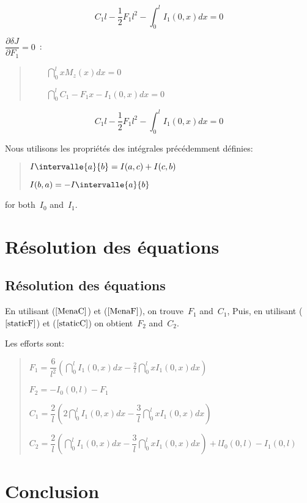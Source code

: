 \begin{equation}
  \label{MenaC}
  C_1l-\frac 12F_1l^2-\int_0^lI_1(0,x)dx=0
\end{equation}

$\dfrac{\partial \delta J}{\partial F_1}=0$~:

\begin{quotation}
$\qquad \dint_0^lxM_z(x)dx=0$

$\qquad \dint_0^lC_1-F_1x-I_1(0,x)dx=0$
\end{quotation}

\begin{equation}
  \label{MenaF}
  C_1l-\frac 12F_1l^2-\int_0^lI_1(0,x)dx=0
\end{equation}

Nous utilisons les propriétés des intégrales précédemment définies:

\begin{quotation}
$I\intervalle{a}{b}=I(a,c)+I(c,b)$

$I(b,a)=-I\intervalle{a}{b}$
\end{quotation}

for both~$I_0$ and~$I_1$.


\medskip
\ifVersionAvecExemplesSepares
  \section{Résolution des équations}
\else
  \subsection{Résolution des équations}
\fi

En utilisant ($\ref{MenaC}$) et ($\ref{MenaF}$), on trouve~$F_1$ and~$C_1$,
Puis, en utilisant ($\ref{staticF}$) et ($\ref{staticC}$) on obtient~$F_2$ and~$C_2$.

Les efforts sont:

\begin{quotation}
$F_1=\dfrac 6{l^2}\left( \dint_0^lI_1(0,x)dx-\frac
2l\dint_0^lxI_1(0,x)dx\right)~$

$F_2=-I_0(0,l)-F_1$

$C_1=\dfrac 2l\left( 2\dint_0^lI_1(0,x)dx-\dfrac
3l\dint_0^lxI_1(0,x)dx\right)~$

$C_2=\dfrac 2l\left( \dint_0^lI_1(0,x)dx-\dfrac
3l\dint_0^lxI_1(0,x)dx\right) +lI_0(0,l)-I_1(0,l)$
\end{quotation}

\medskip
\ifVersionAvecExemplesSepares
  \section{Conclusion}
\else
